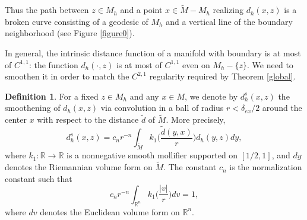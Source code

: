 \documentclass[11pt,letterpaper]{amsart}
\numberwithin{equation}{section}
\theoremstyle{definition}
\theoremstyle{plain}
\theoremstyle{definition}
\theoremstyle{plain}
\theoremstyle{definition}
\newtheorem{definition}[main1]{Definition}
\theoremstyle{plain}
\begin{document}
Thus the path between $z\in M_h$ and a point $x\in \widetilde{M}-M_h$ realizing $d_h(x,z)$ is a broken curve consisting of a geodesic of $M_h$ and a vertical line of the boundary neighborhood (see Figure \ref{figure0}). 

In general, the intrinsic distance function of a manifold with boundary is at most of $C^{1,1}$: the function $d_h(\cdot,z)$ is at most of $C^{1,1}$ even on $M_h-\{z\}$. We need to smoothen it in order to match the $C^{2,1}$ regularity required by Theorem \ref{global}.

\begin{definition}\label{definition-dhs}
For a fixed $z\in M_h$ and any $x\in M$, we denote by $d_h^s (x,z)$ the smoothening of $d_h(x,z)$ via convolution in a ball of radius $r<\delta_{ex}/2$ around the center $x$ with respect to the distance $\widetilde{d}$ of $\widetilde{M}$. More precisely,
\begin{equation}\label{dhsdef}
d_h^s(x,z)=c_{n}r^{-n}\int_{\widetilde{M}}k_1\big(\frac{\widetilde{d}(y,x)}{r}\big)d_h(y,z)dy,
\end{equation}
where $k_1:\mathbb{R}\to \mathbb{R}$ is a nonnegative smooth mollifier supported on $[1/2,1]$, and $dy$ denotes the Riemannian volume form on $\widetilde{M}$. The constant $c_n$ is the normalization constant such that 
\begin{equation}\label{normalization}
c_{n}r^{-n}\int_{\mathbb{R}^n} k_1\big(\frac{|v|}{r}\big)dv=1,
\end{equation}
where $dv$ denotes the Euclidean volume form on $\mathbb{R}^n$.
\end{definition}
\end{document}
